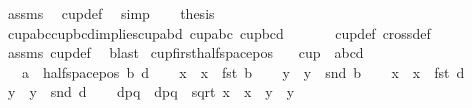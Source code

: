 \begin{isabellebody}
\ assms\ \isamarkupfalse%
\ cup{\isacharunderscore}{\kern0pt}def\ \isamarkupfalse%
\ simp\isanewline
\ \ \isamarkupfalse%
\ {\isacharquery}{\kern0pt}thesis\ \isamarkupfalse%
\ cup{\isacharunderscore}{\kern0pt}abc{\isacharunderscore}{\kern0pt}cup{\isacharunderscore}{\kern0pt}bcd{\isacharunderscore}{\kern0pt}implies{\isacharunderscore}{\kern0pt}cup{\isacharunderscore}{\kern0pt}abd\ cup{\isacharunderscore}{\kern0pt}abc\ cup{\isacharunderscore}{\kern0pt}bcd\ \isanewline
\ \ \ \ \isamarkupfalse%
\ cup{}{\isacharunderscore}{\kern0pt}def\ cross{}{\isacharunderscore}{\kern0pt}def\ \isanewline
\ \ \ \ \isamarkupfalse%
\ assms\ cup{\isacharunderscore}{\kern0pt}def\ \isamarkupfalse%
\ blast\isanewline
{}\isamarkupfalse%
%
\endisatagproof
{\isafoldproof}%
%
\isadelimproof
\isanewline
%
\endisadelimproof
\isanewline
{}\isamarkupfalse%
\ cup{}{\isacharunderscore}{\kern0pt}first{\isacharunderscore}{\kern0pt}halfspace{\isacharunderscore}{\kern0pt}pos{\isacharcolon}{\kern0pt}\isanewline
\ \ \ {\isachardoublequoteopen}cup\ {}\ {\isacharbrackleft}{\kern0pt}a{\isacharcomma}{\kern0pt}b{\isacharcomma}{\kern0pt}c{\isacharcomma}{\kern0pt}d{\isacharbrackright}{\kern0pt}{\isachardoublequoteclose}\isanewline
\ \ \ {\isachardoublequoteopen}a\ {\isasymin}\ halfspace{\isacharunderscore}{\kern0pt}pos\ b\ d{\isachardoublequoteclose}\isanewline
%
\isadelimproof
%
\endisadelimproof
%
\isatagproof
{}\isamarkupfalse%
{\isacharminus}{\kern0pt}\isanewline
\ \ \isamarkupfalse%
\ x{}\ \ {\isachardoublequoteopen}x{}\ {\isasymequiv}\ fst\ b{\isachardoublequoteclose}\isanewline
\ \ \isamarkupfalse%
\ y{}\ \ {\isachardoublequoteopen}y{}\ {\isasymequiv}\ snd\ b{\isachardoublequoteclose}\isanewline
\ \ \isamarkupfalse%
\ x{}\ \ {\isachardoublequoteopen}x{}\ {\isasymequiv}\ fst\ d{\isachardoublequoteclose}\isanewline
\ \ \isamarkupfalse%
\ y{}\ \ {\isachardoublequoteopen}y{}\ {\isasymequiv}\ snd\ d{\isachardoublequoteclose}\isanewline
\ \ \isamarkupfalse%
\ dpq\ \ {\isachardoublequoteopen}dpq\ {\isasymequiv}\ sqrt\ {\isacharparenleft}{\kern0pt}{\isacharparenleft}{\kern0pt}x{}\ {\isacharminus}{\kern0pt}\ x{}{\isacharparenright}{\kern0pt}{\isacharcircum}{\kern0pt}{}\ {\isacharplus}{\kern0pt}\ {\isacharparenleft}{\kern0pt}y{}\ {\isacharminus}{\kern0pt}\ y{}{\isacharparenright}{\kern0pt}{\isacharcircum}{\kern0pt}{}{\isacharparenright}{\kern0pt}{\isachardoublequoteclose}\isanewline

\end{isabellebody}
